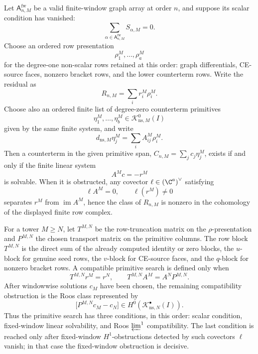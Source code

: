 \begin{prop}\label{prop:finite-row-primitive-search-interface}
  Let \(\mathsf A^{\mathrm{fw}}_{n,M}\) be a valid finite-window graph
  array at order \(n\), and suppose its scalar condition has vanished:
  \[
    \sum_{\alpha\in\mathsf A^{\mathrm{fw}}_{n,M}}S_{\alpha,M}=0.
  \]
  Choose an ordered row presentation
  \[
    \rho^M_1,\ldots,\rho^M_a
  \]
  for the degree-one non-scalar rows retained at this order: graph
  differentials, CE-source faces, nonzero bracket rows, and the lower
  counterterm rows.  Write the residual as
  \[
    R_{n,M}=\sum_i r^M_i\rho^M_i.
  \]
  Choose also an ordered finite list of degree-zero counterterm primitives
  \[
    \eta^M_1,\ldots,\eta^M_b\in
    \mathcal K^0_{\mathrm{ns},M}(I)
  \]
  given by the same finite system, and write
  \[
    d_{\mathrm{ns},M}\eta^M_j=\sum_i A^M_{ij}\rho^M_i.
  \]
  Then a counterterm in the given primitive span,
  \(C_{n,M}=\sum_j c_j\eta^M_j\), exists if and only if the finite linear
  system
  \[
    A^M c=-r^M
  \]
  is solvable.  When it is obstructed, any covector
  \(\ell\in{\left(\C^a\right)}^\vee\) satisfying
  \[
    \ell A^M=0,\qquad \ell(r^M)\neq0
  \]
  separates \(r^M\) from \(\operatorname{im}A^M\), hence the class of
  \(R_{n,M}\) is nonzero in the
  cohomology of the displayed finite row complex.

  For a tower \(M\geq N\), let \(T^{M,N}\) be the row-truncation matrix on
  the \(\rho\)-presentation and \(P^{M,N}\) the chosen transport matrix on
  the primitive columns.  The row block \(T^{M,N}\) is the direct sum of
  the already computed identity or zero blocks, the \(u\)-block for genuine
  seed rows, the \(v\)-block for CE-source faces, and the \(q\)-block for
  nonzero bracket rows.  A compatible primitive search is defined only when
  \[
    T^{M,N}r^M=r^N,\qquad
    T^{M,N}A^M=A^N P^{M,N}.
  \]
  After windowwise solutions \(c_M\) have been chosen, the remaining
  compatibility obstruction is the Roos class represented by
  \[
    \bigl[P^{M,N}c_M-c_N\bigr]\in
    H^0(\mathcal K^\bullet_{\mathrm{ns},N}(I)).
  \]
  Thus the primitive search has three conditions, in this order: scalar condition,
  fixed-window linear solvability, and Roos \(\varprojlim^1\)
	  compatibility.  The last condition is reached only after fixed-window
	  \(H^1\)-obstructions detected by such covectors \(\ell\) vanish;
	  in that case the fixed-window obstruction is decisive.
\end{prop}

